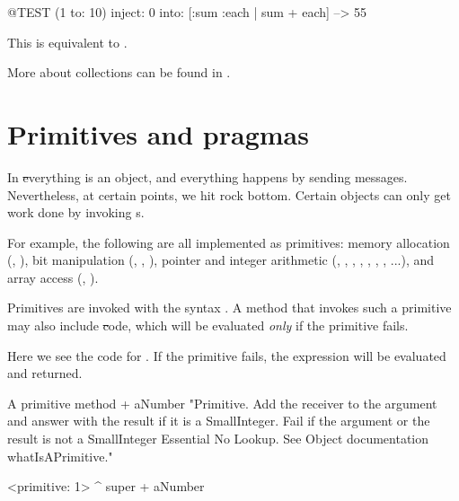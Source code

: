\documentclass[a4paper,10pt,twoside]{book}
\begin{document}
\begin{code}{@TEST}
(1 to: 10) inject: 0 into: [:sum :each | sum + each] --> 55
\end{code}

\noindent
This is equivalent to .

More about collections can be found in .

\section{Primitives and pragmas}

In \st everything is an object, and everything happens by sending messages.
Nevertheless, at certain points, we hit rock bottom.
Certain objects can only get work done by invoking  s.

For example, the following are all implemented as primitives:
memory allocation (, ),
bit manipulation (, , ),
pointer and integer arithmetic (\ct{+}, \ct{-},  \ct{<},  \ct{>}, \ct{*}, \ct{/ }, \ct{=}, \ct{==}...),
and array access (, ).

Primitives are invoked with the syntax .
A method that invokes such a primitive may also include \st code, which will be evaluated \emph{only} if the primitive fails.

Here we see the code for .
If the primitive fails, the expression  will be evaluated and returned.

\begin{method}[primitive]{A primitive method}
+ aNumber 
  "Primitive. Add the receiver to the argument and answer with the result
  if it is a SmallInteger. Fail if the argument or the result is not a
  SmallInteger  Essential  No Lookup. See Object documentation whatIsAPrimitive."

  <primitive: 1>
  ^ super + aNumber
\end{method}

\end{document}
